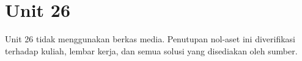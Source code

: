 \section*{Unit 26}
Unit 26 tidak menggunakan berkas media. Penutupan nol-aset ini diverifikasi terhadap kuliah, lembar kerja, dan semua solusi yang disediakan oleh sumber.
